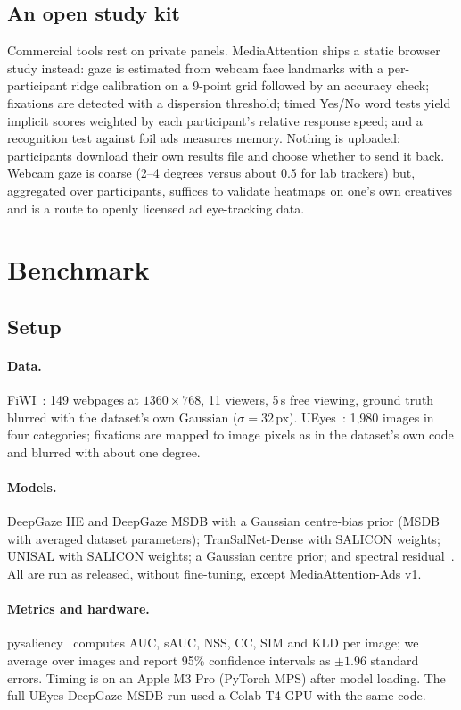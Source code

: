 \documentclass[11pt]{article}
\begin{document}
\subsection{An open study kit}
Commercial tools rest on private panels. MediaAttention ships a static browser study instead: gaze is estimated from
webcam face landmarks with a per-participant ridge calibration on a 9-point grid followed by an accuracy check;
fixations are detected with a dispersion threshold; timed Yes/No word tests yield implicit scores weighted by each
participant's relative response speed; and a recognition test against foil ads measures memory. Nothing is uploaded:
participants download their own results file and choose whether to send it back. Webcam gaze is coarse (2--4 degrees
versus about 0.5 for lab trackers) but, aggregated over participants, suffices to validate heatmaps on one's own
creatives and is a route to openly licensed ad eye-tracking data.

\section{Benchmark}\label{sec:results}
\subsection{Setup}
\paragraph{Data.} FiWI~\cite{shen2014webpage}: 149 webpages at $1360\times768$, 11 viewers, 5\,s free viewing, ground
truth blurred with the dataset's own Gaussian ($\sigma=32$\,px). UEyes~\cite{jiang2023ueyes}: 1,980 images in four
categories; fixations are mapped to image pixels as in the dataset's own code and blurred with about one degree.
\paragraph{Models.} DeepGaze IIE and DeepGaze MSDB with a Gaussian centre-bias prior (MSDB with averaged dataset
parameters); TranSalNet-Dense with SALICON weights; UNISAL with SALICON weights; a Gaussian centre prior; and spectral
residual~\cite{hou2007spectral}. All are run as released, without fine-tuning, except MediaAttention-Ads v1.
\paragraph{Metrics and hardware.} pysaliency~\cite{kummerer2018benchmarking} computes AUC, sAUC, NSS, CC, SIM and KLD
per image; we average over images and report 95\% confidence intervals as $\pm1.96$ standard errors. Timing is on an
Apple M3 Pro (PyTorch MPS) after model loading. The full-UEyes DeepGaze MSDB run used a Colab T4 GPU with the same code.
\end{document}
